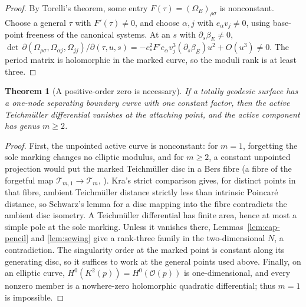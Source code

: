 \documentclass[11pt]{article}
\newcommand{\T}{\mathcal T}
\newtheorem{theorem}{Theorem}
\theoremstyle{remark}
\begin{document}
\begin{proof}
By Torelli's theorem, some entry
\(F(\tau)=(\Omega_E)_{\rho\sigma}\) is nonconstant.
Choose a general \(\tau\) with \(F'(\tau)\ne0\), and
choose \(\alpha,j\) with \(e_\alpha v_j\ne0\), using
base-point freeness of the canonical systems.
At an \(s\) with \(\partial_s\beta_E\ne0\),
\(\det\,\partial(\Omega_{\rho\sigma},\Omega_{\alpha j},\Omega_{jj})
/\partial(\tau,u,s)
=-c_*^2F'e_\alpha v_j^3(\partial_s\beta_E)u^2+O(u^3)\ne0\).
The period matrix is holomorphic in the marked curve, so the
moduli rank is at least three.
\end{proof}

\begin{theorem}[A positive-order zero is necessary]\label{thm:zero}
If a totally geodesic surface has a one-node separating boundary
curve with one constant factor, then the active Teichm\"uller
differential vanishes at the attaching point, and the active
component has genus \(m\ge2\).
\end{theorem}
\begin{proof}
First, the unpointed active curve is nonconstant: for \(m=1\),
forgetting the sole marking changes no elliptic modulus, and for
\(m\ge2\), a constant unpointed projection would put the marked Teichm\"uller disc in
a Bers fibre (a fibre of the forgetful map
\(\T_{m,1}\to\T_m\), \cite[Section 9(B)]{BersFinite}). Kra's strict
comparison \cite[Theorem 3, Section 10]{Kra} gives, for distinct
points in that fibre, ambient Teichm\"uller distance
strictly less than intrinsic Poincar\'e distance, so
Schwarz's lemma for a disc mapping into the fibre
contradicts the ambient disc isometry.
A Teichm\"uller differential has finite area, hence at most a
simple pole at the sole marking. Unless it vanishes there,
Lemmas~\ref{lem:cap-pencil} and \ref{lem:sewing} give
a rank-three family in the two-dimensional \(N\),
a contradiction. The singularity order at the marked
point is constant along its generating disc, so it
suffices to work at the general points used above.
Finally, on an elliptic curve,
\(H^0(K^2(p))=H^0(\mathcal O(p))\) is one-dimensional, and
every nonzero member is a nowhere-zero holomorphic
quadratic differential; thus \(m=1\) is impossible.
\end{proof}
\end{document}
